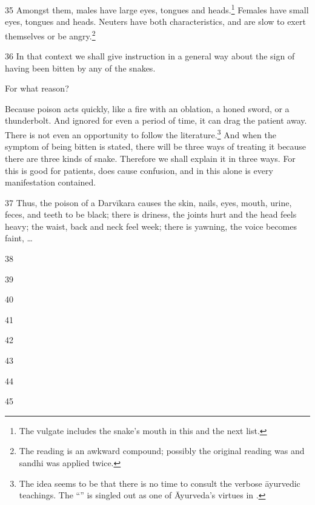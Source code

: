 \begin{translation}
\item[35]
Amongst them, males have large eyes, tongues and heads.\footnote{The 
vulgate includes the snake's mouth in this and the next list.}  Females have 
small 
eyes, tongues and heads. Neuters have both characteristics, and are slow to 
exert themselves or be angry.\footnote{The reading  
is an awkward compound; possibly the original reading was  and sandhi was applied twice.}

\item[36] In that context we shall give instruction in a general way
about the sign of having been bitten by any of the snakes.

For what reason?

Because poison acts quickly, like a fire with an oblation, a honed sword,
or a thunderbolt.  And ignored for even a period of time, it can drag the
patient away. There is not even an opportunity to follow the
literature.\footnote{The idea seems to be that there is no time to
    consult the verbose āyurvedic teachings.  The
    “” is
    singled out as one of Āyurveda's virtues in .} %
    And when the symptom of being bitten is stated, there will be three ways of 
    treating it because there are three kinds of snake. Therefore we shall
    explain it in three ways. For this is good for patients, does cause
    confusion, and in this alone is every manifestation contained.

\item[37]
Thus, the poison of a Darvīkara causes the skin, nails, eyes, mouth, urine, feces, 
and teeth to be black; there is driness, the joints hurt and the head feels heavy; 
the waist, back and neck feel week; there is yawning, the voice becomes faint, 
\ldots


\item[38]
\item[39]
\item[40]
\item[41]
\item[42]
\item[43]
\item[44]
\item[45]



    
\end{translation}